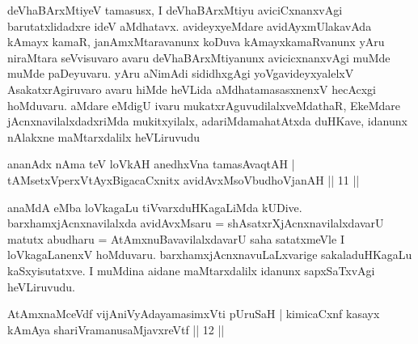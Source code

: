 
\begin{artha}
 deVhaBArxMtiyeV tamasusx, I deVhaBArxMtiyu aviciCxnanxvAgi barutatxlidadxre ideV aMdhatavx. avideyxyeMdare avidAyxmUlakavAda kAmayx kamaR, janAmxMtaravanunx koDuva kAmayxkamaRvanunx yAru niraMtara seVvisuvaro avaru deVhaBArxMtiyanunx avicicxnanxvAgi muMde muMde paDeyuvaru. yAru aNimAdi sididhxgAgi yoVgavideyxyalelxV AsakatxrAgiruvaro avaru hiMde heVLida aMdhatamasasxnenxV hecAcxgi hoMduvaru. aMdare eMdigU ivaru mukatxrAguvudilalxveMdathaR, EkeMdare jAcnxnavilalxdadxriMda mukitxyilalx, adariMda\break mahatAtxda duHKave, idanunx nAlakxne maMtarxdalilx heVLiruvudu\ndash  
\end{artha}

\begin{shl}
ananAdx nAma teV loVkAH anedhxVna tamasAvaqtAH |\\
tAMsetxVperxVtAyxBigacaCxnitx avidAvxMsoV\s budhoVjanAH || 11 ||
\end{shl}

\begin{artha} %
anaMdA eMba loVkagaLu tiVvarxduHKagaLiMda kUDive. barxhamxjAcnxnavilalxda avidAvxMsaru = shAsatxrXjAcnxnavilalxdavarU matutx abudharu = AtAmxnuBavavilalxdavarU saha satatxmeVle I loVkagaLanenxV hoMduvaru. barxhamxjAcnxnavuLaLxvarige sakaladuHKagaLu kaSxyisutatxve. I muMdina aidane maMtarxdalilx idanunx sapxSaTxvAgi heVLiruvudu. \ndash 
\end{artha}

\begin{shl}
AtAmxnaMceVdf vijAniVyAdayamasimxVti pUruSaH |
kimicaCxnf kasayx kAmAya shariVramanusaMjavxreVtf || 12 ||
\end{shl}


